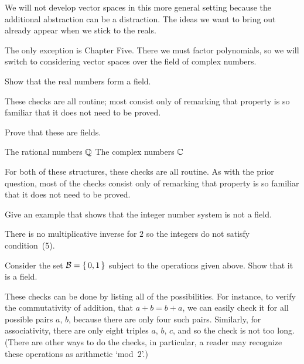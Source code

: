 We will not develop vector spaces in this more general setting because
the additional abstraction can be a distraction.
The ideas we want to bring out already appear when we stick to the reals.

The only exception is Chapter Five.
There we must factor polynomials,
so we will switch to considering vector spaces over the
field of complex numbers.

\begin{exercises}
  \item 
    Show that the real numbers form a field.
    \begin{answer}
      These checks are all routine; most consist only of remarking that 
      property is so familiar that it does not need to be proved.
    \end{answer}
  \item 
    Prove that these are fields.
    \begin{exparts*}
       \partsitem The rational numbers $\mathbb{Q}$
       \partsitem The complex numbers  $\mathbb{C}$
    \end{exparts*}
    \begin{answer}
      For both of these structures, these checks are all routine.
      As with the prior question, most of the checks consist only of remarking
      that property is so familiar that it does not need to be proved.
    \end{answer}
  \item 
     Give an example that shows that the integer number system
     is not a field.
     \begin{answer}
       There is no multiplicative inverse for $2$ so the integers do not
       satisfy condition~(5).
     \end{answer}
  \item \label{exer:BinField} 
     Consider the set $\mathcal{B}=\mbox{$\{\,0,1\,\}$}$ subject to the operations 
     given above.
     Show that it is a field.
     \begin{answer}
       These checks can be done by listing all of the possibilities.
       For instance, to verify the commutativity of addition, that $a+b=b+a$,
       we can easily check it for all possible pairs $a$, $b$, because there
       are only four such pairs.  
       Similarly, for associativity, there are only eight triples $a$, $b$,
       $c$, and so the check is not too long.
       (There are other ways to do the checks, in particular, a reader may 
       recognize these operations as arithmetic `mod~$2$'.)
     \end{answer}

\end{exercises}
